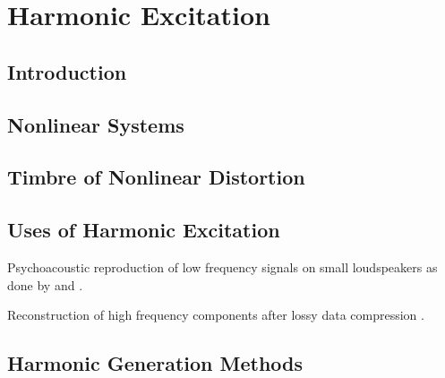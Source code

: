 
\chapter{Harmonic Excitation}
\label{chap:Excitation}

\section{Introduction}
\label{sec:Excitation-Introduction}

\section{Nonlinear Systems}
\label{sec:Excitation-NonlinearSystems}

\section{Timbre of Nonlinear Distortion}
\label{sec:Excitation-Timbre}

\section{Uses of Harmonic Excitation}
\label{sec:Excitation-Uses}
	\note
	{
		Psychoacoustic reproduction of low frequency signals on small loudspeakers as done by \citet{larsen2002reproducing} and \citet{gan2001virtual}.

		Reconstruction of high frequency components after lossy data compression \citep{friedrich2007spectral, nagel2009a, nagel2010a, valin2000bandwidth, dietz2002spectral, larsen2002efficient, sha2010high}.
	}

\section{Harmonic Generation Methods}
\label{sec:Excitation-Methods}

